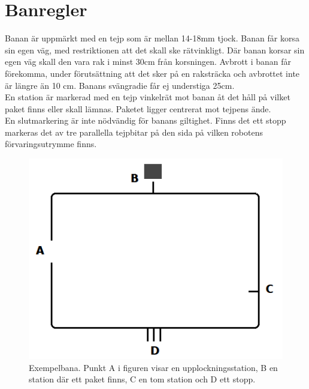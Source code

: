 \section{Banregler} \label{banregler}

Banan är uppmärkt med en tejp som är mellan 14-18mm tjock. Banan får korsa sin egen väg, med restriktionen att det skall ske rätvinkligt. Där banan korsar sin egen väg skall den vara rak i minst 30cm från korsningen. Avbrott i banan får förekomma, under förutsättning att det sker på en raksträcka och avbrottet inte är längre än 10 cm. Banans svängradie får ej understiga 25cm. \\
En station är markerad med en tejp vinkelrät mot banan åt det håll på vilket paket finns eller skall lämnas. Paketet ligger centrerat mot tejpens ände. \\
En slutmarkering är inte nödvändig för banans giltighet. Finns det ett stopp markeras det av tre parallella tejpbitar på den sida på vilken robotens förvaringsutrymme finns. \\

\begin{figure}[h]
\center
\includegraphics[scale=0.6]{figur.png}
\endcenter
\caption{Exempelbana. Punkt A i figuren visar en upplockningsstation, B en station där ett paket finns, C en tom station och D ett stopp.}
\end{figure}